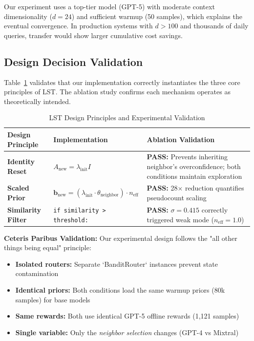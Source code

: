 \documentclass[sigconf,nonacm]{acmart}
\begin{document}
Our experiment uses a top-tier model (GPT-5) with moderate context dimensionality ($d=24$) and sufficient warmup (50 samples), which explains the eventual convergence. In production systems with $d > 100$ and thousands of daily queries, transfer would show larger cumulative cost savings.

\subsection{Design Decision Validation}

Table~\ref{tab:design} validates that our implementation correctly instantiates the three core principles of LST. The ablation study confirms each mechanism operates as theoretically intended.

\begin{table}[h]
\centering
\caption{LST Design Principles and Experimental Validation}
\label{tab:design}
\begin{tabular}{p{3cm}p{4cm}p{4cm}}
\toprule
\textbf{Design Principle} & \textbf{Implementation} & \textbf{Ablation Validation} \\
\midrule
\textbf{Identity Reset} & $A_{\text{new}} = \lambda_{\text{init}} I$ & \textbf{PASS:} Prevents inheriting neighbor's overconfidence; both conditions maintain exploration & \\

\textbf{Scaled Prior} & $\mathbf{b}_{\text{new}} = (\lambda_{\text{init}} \cdot \theta_{\text{neighbor}}) \cdot n_{\text{eff}}$ & \textbf{PASS:} 28$\times$ reduction quantifies pseudocount scaling \\

\textbf{Similarity Filter} & \texttt{if similarity > threshold:} & \textbf{PASS:} $\sigma = 0.415$ correctly triggered weak mode ($n_{\text{eff}} = 1.0$) \\
\bottomrule
\end{tabular}
\end{table}

\textbf{Ceteris Paribus Validation:} Our experimental design follows the "all other things being equal" principle:
\begin{itemize}
    \item \textbf{Isolated routers:} Separate `BanditRouter` instances prevent state contamination
    \item \textbf{Identical priors:} Both conditions load the same warmup priors (80k samples) for base models
    \item \textbf{Same rewards:} Both use identical GPT-5 offline rewards (1,121 samples)
    \item \textbf{Single variable:} Only the \textit{neighbor selection} changes (GPT-4 vs Mixtral)
\end{itemize}
\end{document}
